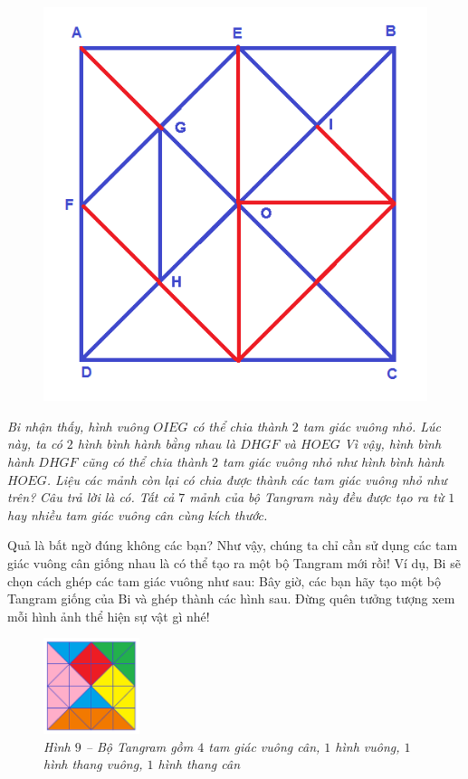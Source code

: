 \begin{figure}[H]
	\includegraphics[scale=0.2]{image12}
	\end{figure}
	\textit{Bi nhận thấy, hình vuông $OIEG$ có thể chia thành $2$ tam giác vuông nhỏ. Lúc này, ta có $2$ hình  bình hành bằng nhau là $DHGF$ và $HOEG$}
	\vskip 0.1cm
	\textit{Vì vậy, hình bình hành $DHGF$ cũng có thể chia thành $2$ tam giác vuông nhỏ như hình bình hành $HOEG$.
	\vskip 0.1cm
	Liệu các mảnh còn lại có chia được thành các tam giác vuông nhỏ như trên?}
	\vskip 0.1cm
	\textit{Câu trả lời là có.
	\vskip 0.1cm
	Tất cả $7$ mảnh của bộ Tangram này đều được tạo ra từ $1$ hay nhiều tam giác vuông cân cùng kích thước.}
	\begin{multicols}{2}
	Quả là bất ngờ đúng không các bạn? Như vậy, chúng ta chỉ cần sử dụng các tam giác vuông cân giống nhau là có thể tạo ra một bộ Tangram mới rồi! Ví dụ, Bi sẽ chọn cách ghép các tam giác vuông như sau:
	\vskip 0.1cm
		Bây giờ, các bạn hãy tạo một bộ Tangram giống của Bi và ghép thành các hình sau. Đừng quên tưởng tượng xem mỗi hình ảnh thể hiện sự vật gì nhé!
		\begin{figure}[H]
			\vspace*{-15pt}
			\centering
			\captionsetup{labelformat=empty}
			\includegraphics[width=0.25\textwidth]{image13}
			\caption{\small \it Hình $9$ -- Bộ Tangram gồm $4$ tam giác vuông cân, $1$ hình vuông, $1$ hình thang vuông, $1$ hình thang cân}
			\vspace*{-5pt}
		\end{figure}
	\end{multicols}
